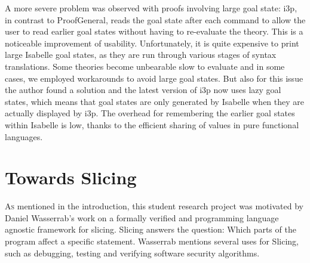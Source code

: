 \documentclass[a4paper,parskip=half,BCOR=8mm,DIV=calc,12pt]{scrbook}
\begin{document}
\enlargethispage{2em}
A more severe problem was observed with proofs involving large goal state: i3p, in contrast to ProofGeneral, reads the goal state after each command to allow the user to read earlier goal states without having to re-evaluate the theory. This is a noticeable improvement of usability. Unfortunately, it is quite expensive to print large Isabelle goal states, as they are run through various stages of syntax translations. Some theories become unbearable slow to evaluate and in some cases, we employed workarounds to avoid large goal states. But also for this issue the author found a solution and the latest version of i3p now uses lazy goal states, which means that goal states are only generated by Isabelle when they are actually displayed by i3p. The overhead for remembering the earlier goal states within Isabelle is low, thanks to the efficient sharing of values in pure functional languages. 


\chapter{Towards Slicing}
\label{chapslicing}

\lettrine[lines=3]As mentioned in the introduction, this student research project was motivated by Daniel Wasserrab’s work on a formally verified and programming language agnostic framework for slicing. Slicing answers the question: Which parts of the program affect a specific statement. Wasserrab mentions several uses for Slicing, such as debugging, testing and verifying software security algorithms.
\end{document}
